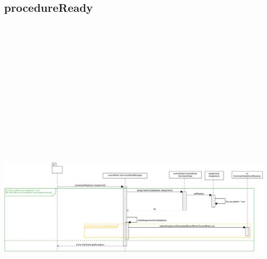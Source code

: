 \subsection{procedureReady}
\centering\includegraphics[max width=\textwidth, max height=190mm]{../resources/img/GCC/DSD/op5a.png}

